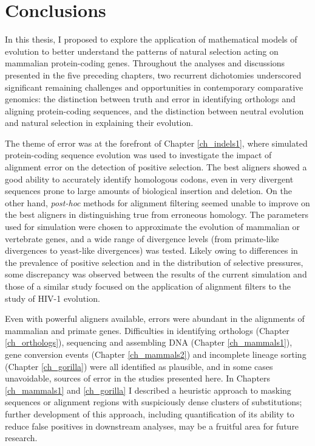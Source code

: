 \chapter{Conclusions}
\label{ch_conclusions}
\acresetall

In this thesis, I proposed to explore the application of mathematical
models of evolution to better understand the patterns of natural
selection acting on mammalian protein-coding genes. Throughout the
analyses and discussions presented in the five preceding chapters, two
recurrent dichotomies underscored significant remaining challenges and
opportunities in contemporary comparative genomics: the distinction
between truth and error in identifying orthologs and aligning
protein-coding sequences, and the distinction between neutral
evolution and natural selection in explaining their evolution.

The theme of error was at the forefront of Chapter \ref{ch_indels1},
where simulated protein-coding sequence evolution was used to
investigate the impact of alignment error on the detection of \sw
positive selection. The best aligners showed a good ability to
accurately identify homologous codons, even in very divergent
sequences prone to large amounts of biological insertion and
deletion. On the other hand, \emph{post-hoc} methods for alignment
filtering seemed unable to improve on the best aligners in
distinguishing true from erroneous homology. The parameters used for
simulation were chosen to approximate the evolution of mammalian or
vertebrate genes, and a wide range of divergence levels (from
primate-like divergences to yeast-like divergences) was tested. Likely
owing to differences in the prevalence of positive selection and in
the distribution of selective pressures, some discrepancy was observed
between the results of the current simulation and those of a similar
study focused on the application of alignment filters to the study of
HIV-1 evolution.

Even with powerful aligners available, errors were abundant in the
alignments of mammalian and primate genes. Difficulties in identifying
orthologs (Chapter \ref{ch_orthologs}), sequencing and assembling DNA
(Chapter \ref{ch_mammals1}), gene conversion events (Chapter
\ref{ch_mammals2}) and incomplete lineage sorting (Chapter
\ref{ch_gorilla}) were all identified as plausible, and in some cases
unavoidable, sources of error in the studies presented here. In
Chapters \ref{ch_mammals1} and \ref{ch_gorilla} I described a
heuristic approach to masking sequences or alignment regions with
suspiciously dense clusters of \nsyn substitutions; further
development of this approach, including quantification of its ability
to reduce false positives in downstream analyses, may be a fruitful
area for future research.

